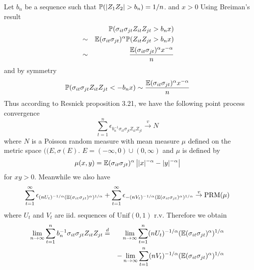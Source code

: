 \documentclass{article}
\begin{document}
Let $b_n$ be a sequence such that $\P(|Z_1 Z_2| > b_n) = 1/n$. and $x
> 0$ Using Breiman's result
\begin{eqnarray*}
  && \P(\sigma_{it} \sigma_{jt} Z_{it} Z_{jt} > b_n x) \\
  &\sim& \E(\sigma_{it} \sigma_{jt})^{\alpha} \P(Z_{it} Z_{jt} > b_n x) \\
  &\sim& {\E(\sigma_{it} \sigma_{jt})^{\alpha}x^{-\alpha} \over n} \\
\end{eqnarray*}
and by symmetry
\[
\P(\sigma_{it} \sigma_{jt} Z_{it} Z_{jt} < -b_n x) \sim
{\E(\sigma_{it} \sigma_{jt})^{\alpha}x^{-\alpha} \over n}
\]
Thus according to Resnick \cite{Resnick1987} proposition 3.21, we have
the following point process convergence
\[
\sum_{t=1}^{n} \epsilon_{b_n^{-1} \sigma_{it} \sigma_{jt} Z_{it}
  Z_{jt}} \overset{v}{\to} N
\]
where $N$ is a Poisson random measure with mean measure $\mu$ defined
on the metric space $((E, \sigma(E)$. $E=(-\infty, 0)\cup(0, \infty)$
and $\mu$ is defined by
\[
\mu(x, y) = \E(\sigma_{it} \sigma_{jt})^{\alpha} \left||x|^{-\alpha} - |y|^{-\alpha}\right|
\]
for $xy > 0$. Meanwhile we also have
\[
\sum_{t=1}^\infty\epsilon_{(nU_t)^{-1/\alpha}
  (\E(\sigma_{it}\sigma_{jt})^{\alpha})^{1/\alpha}} +
\sum_{t=1}^\infty \epsilon_{-(nV_t)^{-1/\alpha}
  (\E(\sigma_{it}\sigma_{jt})^{\alpha})^{1/\alpha}} \overset{v}{\to}
\text{PRM}(\mu)
\]
where $U_t$ and $V_t$ are iid. sequences of $\text{Unif}(0, 1)$ r.v. Therefore we obtain
\begin{eqnarray*}
  \lim_{n\to \infty} \sum_{t=1}^{n} b_n^{-1} \sigma_{it} \sigma_{jt}
  Z_{it} Z_{jt} &\overset{d}{=}& \lim_{n\to \infty} \sum_{t=1}^{n}
  (nU_t)^{-1/\alpha} (\E(\sigma_{it}\sigma_{jt})^{\alpha})^{1/\alpha}
  \\
  && - \lim_{n\to \infty} \sum_{t=1}^{n}(nV_t)^{-1/\alpha}
  (\E(\sigma_{it}\sigma_{jt})^{\alpha})^{1/\alpha}
\end{eqnarray*}
\end{document}
